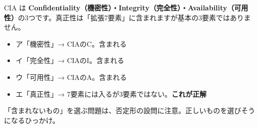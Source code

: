 \begin{kaisetsu}
CIA は \textbf{Confidentiality（機密性）・Integrity（完全性）・Availability（可用性）}の3つです。真正性は「拡張7要素」に含まれますが基本の3要素ではありません。
\end{kaisetsu}

\begin{goutoubun}
\begin{itemize}
  \item ア「機密性」→ CIAのC。含まれる
  \item イ「完全性」→ CIAのI。含まれる
  \item ウ「可用性」→ CIAのA。含まれる
  \item エ「真正性」→ 7要素には入るが3要素ではない。\textbf{これが正解}
\end{itemize}
「含まれないもの」を選ぶ問題は、否定形の設問に注意。正しいものを選びそうになるひっかけ。
\end{goutoubun}

